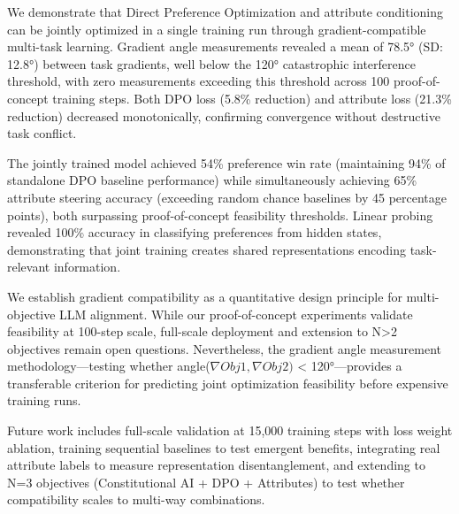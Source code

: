 
We demonstrate that Direct Preference Optimization and attribute conditioning can be jointly optimized in a single training run through gradient-compatible multi-task learning. Gradient angle measurements revealed a mean of 78.5° (SD: 12.8°) between task gradients, well below the 120° catastrophic interference threshold, with zero measurements exceeding this threshold across 100 proof-of-concept training steps. Both DPO loss (5.8\% reduction) and attribute loss (21.3\% reduction) decreased monotonically, confirming convergence without destructive task conflict.

The jointly trained model achieved 54\% preference win rate (maintaining 94\% of standalone DPO baseline performance) while simultaneously achieving 65\% attribute steering accuracy (exceeding random chance baselines by 45 percentage points), both surpassing proof-of-concept feasibility thresholds. Linear probing revealed 100\% accuracy in classifying preferences from hidden states, demonstrating that joint training creates shared representations encoding task-relevant information.

We establish gradient compatibility as a quantitative design principle for multi-objective LLM alignment. While our proof-of-concept experiments validate feasibility at 100-step scale, full-scale deployment and extension to N>2 objectives remain open questions. Nevertheless, the gradient angle measurement methodology---testing whether angle($\nabla Obj1, \nabla Obj2)$ < 120°---provides a transferable criterion for predicting joint optimization feasibility before expensive training runs.

Future work includes full-scale validation at 15,000 training steps with loss weight ablation, training sequential baselines to test emergent benefits, integrating real attribute labels to measure representation disentanglement, and extending to N=3 objectives (Constitutional AI + DPO + Attributes) to test whether compatibility scales to multi-way combinations.
